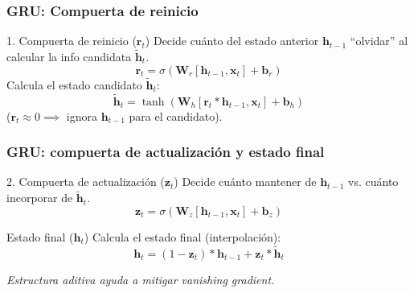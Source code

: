 \documentclass[handout]{beamer}
\newcommand{\vect}[1]{\mathbf{#1}} %
\newcommand{\mat}[1]{\mathbf{#1}}  %
\begin{document}
\begin{frame}
    \frametitle{GRU: Compuerta de reinicio}
    \begin{block}{1. Compuerta de reinicio ($\vect{r}_t$)}
        Decide cuánto del estado anterior $\vect{h}_{t-1}$ ``olvidar'' al calcular la info candidata $\tilde{\vect{h}}_t$.
        \[ \vect{r}_t = \sigma(\mat{W}_r [\vect{h}_{t-1}, \vect{x}_t] + \vect{b}_r) \]
        Calcula el estado candidato $\tilde{\vect{h}}_t$:
        \[ \tilde{\vect{h}}_t = \tanh(\mat{W}_h [\vect{r}_t * \vect{h}_{t-1}, \vect{x}_t] + \vect{b}_h) \]
         ($\vect{r}_t \approx 0 \implies$ ignora $\vect{h}_{t-1}$ para el candidato).
    \end{block}
\end{frame}

\begin{frame}
    \frametitle{GRU: compuerta de actualización y estado final}
     \begin{block}{2. Compuerta de actualización ($\vect{z}_t$)}
        Decide cuánto mantener de $\vect{h}_{t-1}$ vs. cuánto incorporar de $\tilde{\vect{h}}_t$.
         \[ \vect{z}_t = \sigma(\mat{W}_z [\vect{h}_{t-1}, \vect{x}_t] + \vect{b}_z) \]
    \end{block}
     \begin{block}{Estado final ($\vect{h}_t$)}
         Calcula el estado final (interpolación):
         \[ \vect{h}_t = (1 - \vect{z}_t) * \vect{h}_{t-1} + \vect{z}_t * \tilde{\vect{h}}_t \]
    \end{block}
    \begin{center} \footnotesize \bigskip
    \textit{Estructura aditiva ayuda a mitigar vanishing gradient.}
    \end{center}
\end{frame}
\end{document}
